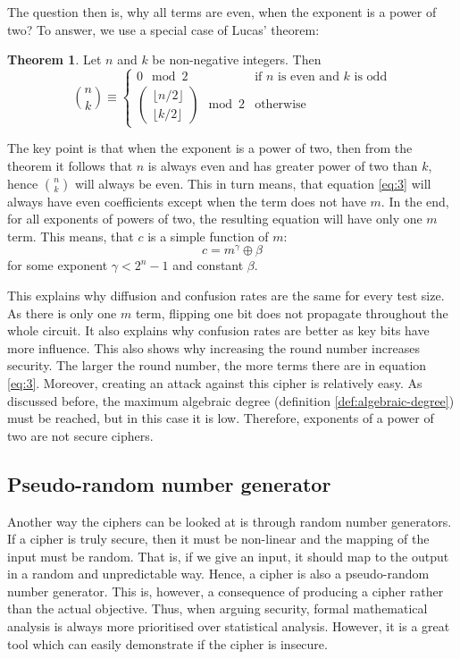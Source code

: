 \documentclass{Resources/UoBLab1}
\theoremstyle{definition}
\newtheorem{theorem}{Theorem}[section]
\begin{document}
The question then is, why all terms are even, when the exponent is a power of two? To answer, we use a special case of Lucas' theorem\cite{BinomialGod}:
\begin{theorem}
    Let $n$ and $k$ be non-negative integers. Then
    \begin{equation*}
        \binom{n}{k} \equiv \left\{ \begin{array}{ll}
            0 \mod 2 &\text{if $n$ is even and $k$ is odd}\\
            \begin{pmatrix}
                \lfloor n/2 \rfloor \\
                \lfloor k/2 \rfloor
            \end{pmatrix}\mod 2 &\text{otherwise}
            \end{array} \right.
    \end{equation*}
\end{theorem}
The key point is that when the exponent is a power of two, then from the theorem it follows that $n$ is always even and has greater power of two than $k$, hence $\binom{n}{k}$ will always be even. This in turn means, that equation \eqref{eq:3} will always have even coefficients except when the term does not have $m$. In the end, for all exponents of powers of two, the resulting equation will have only one $m$ term. This means, that $c$ is a simple function of $m$:
\[
    c = m^\gamma \oplus \beta
\]
for some exponent $\gamma < 2^n -1$ and constant $\beta$.

This explains why diffusion and confusion rates are the same for every test size. As there is only one $m$ term, flipping one bit does not propagate throughout the whole circuit. It also explains why confusion rates are better as key bits have more influence. This also shows why increasing the round number increases security. The larger the round number, the more terms there are in equation \eqref{eq:3}. Moreover, creating an attack against this cipher is relatively easy. As discussed before, the maximum algebraic degree (definition \ref{def:algebraic-degree}) must be reached, but in this case it is low. Therefore, exponents of a power of two are not secure ciphers.


\subsection{Pseudo-random number generator}\label{sub:prng}
Another way the ciphers can be looked at is through random number generators. If a cipher is truly secure, then it must be non-linear and the mapping of the input must be random. That is, if we give an input, it should map to the output in a random and unpredictable way. Hence, a cipher is also a pseudo-random number generator. This is, however, a consequence of producing a cipher rather than the actual objective. Thus, when arguing security, formal mathematical analysis is always more prioritised over statistical analysis. However, it is a great tool which can easily demonstrate if the cipher is insecure.
\end{document}
